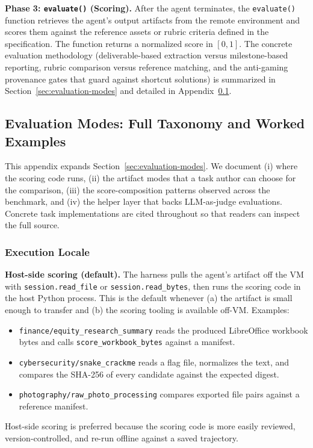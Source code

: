 \documentclass{llmxive}
\begin{document}
\noindent \textbf{Phase 3: \texttt{evaluate()} (Scoring).}
After the agent terminates, the \texttt{evaluate()} function retrieves the agent's output artifacts from the remote environment and scores them against the reference assets or rubric criteria defined in the specification. The function returns a normalized score in $[0, 1]$. The concrete evaluation methodology (deliverable-based extraction versus milestone-based reporting, rubric comparison versus reference matching, and the anti-gaming provenance gates that guard against shortcut solutions) is summarized in Section~\ref{sec:evaluation-modes} and detailed in Appendix~\ref{app:evaluation-modes}.

\subsection{Evaluation Modes: Full Taxonomy and Worked Examples}
\label{app:evaluation-modes}

This appendix expands Section~\ref{sec:evaluation-modes}. We document (i) where the scoring code runs, (ii) the artifact modes that a task author can choose for the comparison, (iii) the score-composition patterns observed across the benchmark, and (iv) the helper layer that backs LLM-as-judge evaluations. Concrete task implementations are cited throughout so that readers can inspect the full source.

\subsubsection{Execution Locale}
\label{app:eval-locale}

\noindent \textbf{Host-side scoring (default).}
The harness pulls the agent's artifact off the VM with \texttt{session.read\_file} or \texttt{session.read\_bytes}, then runs the scoring code in the host Python process. This is the default whenever (a) the artifact is small enough to transfer and (b) the scoring tooling is available off-VM. Examples:
\begin{itemize}[nosep,leftmargin=1.2em]
    \item \texttt{finance/equity\_research\_summary} reads the produced LibreOffice workbook bytes and calls \texttt{score\_workbook\_bytes} against a manifest.
    \item \texttt{cybersecurity/snake\_crackme} reads a flag file, normalizes the text, and compares the SHA-256 of every candidate against the expected digest.
    \item \texttt{photography/raw\_photo\_processing} compares exported file pairs against a reference manifest.
\end{itemize}
Host-side scoring is preferred because the scoring code is more easily reviewed, version-controlled, and re-run offline against a saved trajectory.
\end{document}
